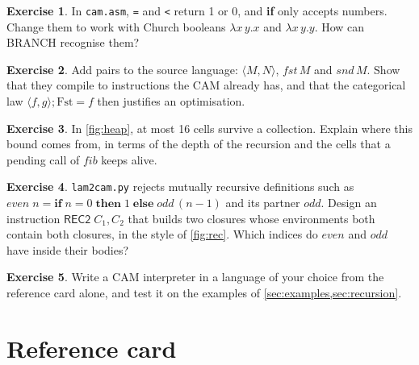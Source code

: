 \documentclass[11pt,a4paper]{article}
\newcommand{\ins}[1]{\textsf{#1}}
\newcommand{\seq}{\mathbin{;}}
\newcommand{\cat}[1]{\mathrm{#1}}
\newcommand{\tpair}[2]{\langle #1, #2\rangle}
\theoremstyle{definition}
\newtheorem{exercise}{Exercise}
\theoremstyle{plain}
\begin{document}
\begin{exercise}
In \texttt{cam.asm}, \texttt{=} and \texttt{<} return 1 or 0, and \textbf{if}
only accepts numbers. Change them to work with Church booleans
$\lambda x\,y.x$ and $\lambda x\,y.y$. How can \ins{BRANCH} recognise them?
\end{exercise}

\begin{exercise}
\label{ex:pairs}Add pairs to the source language: $\langle M, N\rangle$, $\mathit{fst}\,M$
and $\mathit{snd}\,M$. Show that they compile to instructions the CAM already
has, and that the categorical law $\tpair{f}{g}\seq\cat{Fst} = f$ then
justifies an optimisation.
\end{exercise}

\begin{exercise}
In \cref{fig:heap}, at most 16 cells survive a collection. Explain where this
bound comes from, in terms of the depth of the recursion and the cells that a
pending call of $\mathit{fib}$ keeps alive.
\end{exercise}

\begin{exercise}\label{ex:mutual}
\texttt{lam2cam.py} rejects mutually recursive definitions such as
$\mathit{even}\;n = \textbf{if}\;n = 0\;\textbf{then}\;1\;\textbf{else}\;
\mathit{odd}\,(n-1)$ and its partner $\mathit{odd}$. Design an instruction
$\ins{REC2}\;C_1, C_2$ that builds two closures whose environments both
contain both closures, in the style of \cref{fig:rec}. Which indices do
$\mathit{even}$ and $\mathit{odd}$ have inside their bodies?
\end{exercise}

\begin{exercise}
Write a CAM interpreter in a language of your choice from the reference card
alone, and test it on the examples of \cref{sec:examples,sec:recursion}.
\end{exercise}

\section{Reference card}\label{sec:card}
\end{document}
